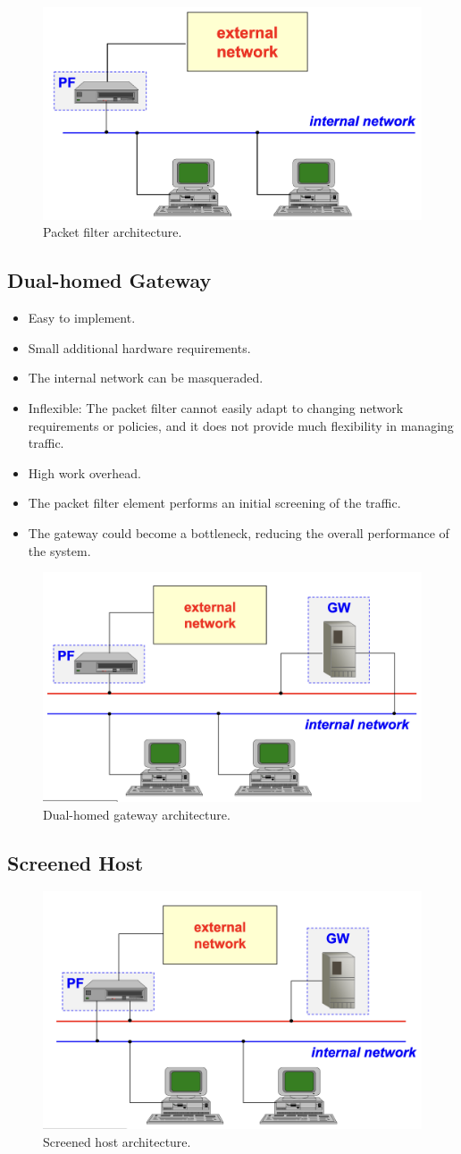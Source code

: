 \begin{figure}[H]
    \centering
    \includegraphics[width=0.5\linewidth]{Images/Firewalling/packet_filter.png}
    \caption{Packet filter architecture.}
\end{figure}

\subsection{Dual-homed Gateway}
\begin{itemize}
    \item Easy to implement.
    \item Small additional hardware requirements.
    \item The internal network can be masqueraded.
    \item Inflexible: The packet filter cannot easily adapt to changing network requirements or policies, and it does not provide much flexibility in managing traffic.
    \item High work overhead.
    \item The packet filter element performs an initial screening of the traffic.
    \item The gateway could become a bottleneck, reducing the overall performance of the system.
\end{itemize}

\begin{figure}[H]
    \centering
    \includegraphics[width=0.5\linewidth]{Images/Firewalling/dual_homed_gateway.png}
    \caption{Dual-homed gateway architecture.}
\end{figure}

\subsection{Screened Host}


\begin{figure}[H]
    \centering
    \includegraphics[width=0.5\linewidth]{Images/Firewalling/screened_host.png}
    \caption{Screened host architecture.}
\end{figure}